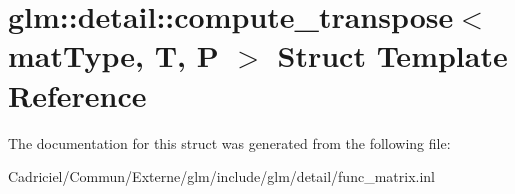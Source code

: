 \hypertarget{structglm_1_1detail_1_1compute__transpose}{}\section{glm\+:\+:detail\+:\+:compute\+\_\+transpose$<$ mat\+Type, T, P $>$ Struct Template Reference}
\label{structglm_1_1detail_1_1compute__transpose}


The documentation for this struct was generated from the following file\+:\begin{DoxyCompactItemize}
\item 
Cadriciel/\+Commun/\+Externe/glm/include/glm/detail/func\+\_\+matrix.\+inl\end{DoxyCompactItemize}
